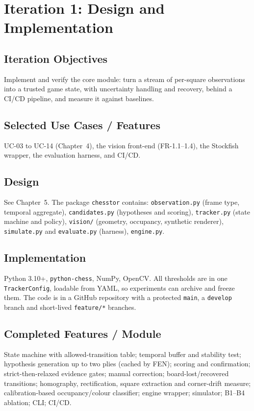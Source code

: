 \chapter{Iteration 1: Design and Implementation}
\section{Iteration Objectives}
Implement and verify the core module: turn a stream of per-square observations into a trusted game state, with
uncertainty handling and recovery, behind a CI/CD pipeline, and measure it against baselines.

\section{Selected Use Cases / Features}
UC-03 to UC-14 (Chapter~4), the vision front-end (FR-1.1--1.4), the Stockfish wrapper, the evaluation harness, and CI/CD.

\section{Design}
See Chapter~5. The package \texttt{chesstor} contains: \texttt{observation.py} (frame type, temporal aggregate),
\texttt{candidates.py} (hypotheses and scoring), \texttt{tracker.py} (state machine and policy), \texttt{vision/}
(geometry, occupancy, synthetic renderer), \texttt{simulate.py} and \texttt{evaluate.py} (harness), \texttt{engine.py}.

\section{Implementation}
Python 3.10+, \texttt{python-chess}, NumPy, OpenCV. All thresholds are in one \texttt{TrackerConfig}, loadable from YAML,
so experiments can archive and freeze them. The code is in a GitHub repository with a protected \texttt{main}, a
\texttt{develop} branch and short-lived \texttt{feature/*} branches.

\section{Completed Features / Module}
State machine with allowed-transition table; temporal buffer and stability test; hypothesis generation up to
two plies (cached by FEN); scoring and confirmation; strict-then-relaxed evidence gates; manual correction;
board-lost/recovered transitions; homography, rectification, square extraction and corner-drift measure;
calibration-based occupancy/colour classifier; engine wrapper; simulator; B1--B4 ablation; CLI; CI/CD.


